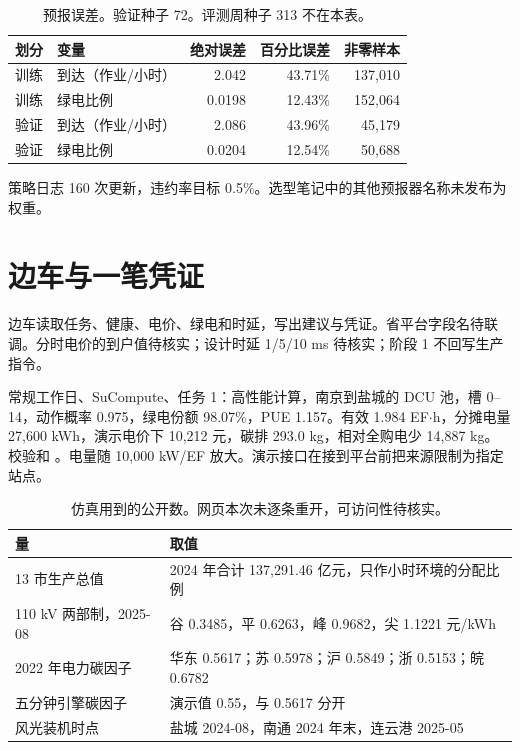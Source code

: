 \begin{table}[ht]
\centering
\caption{预报误差。验证种子 72。评测周种子 313 不在本表。}
\begin{tabular}{llrrr}
\toprule
划分 & 变量 & 绝对误差 & 百分比误差 & 非零样本 \\
\midrule
训练 & 到达（作业/小时） & 2.042 & 43.71\% & 137{,}010 \\
训练 & 绿电比例 & 0.0198 & 12.43\% & 152{,}064 \\
验证 & 到达（作业/小时） & 2.086 & 43.96\% & 45{,}179 \\
验证 & 绿电比例 & 0.0204 & 12.54\% & 50{,}688 \\
\bottomrule
\end{tabular}
\end{table}

策略日志 160 次更新，违约率目标 0.5\%。选型笔记中的其他预报器名称未发布为权重。

\section{边车与一笔凭证}
边车读取任务、健康、电价、绿电和时延，写出建议与凭证。省平台字段名待联调。分时电价的到户值待核实；设计时延 1/5/10 ms 待核实；阶段 1 不回写生产指令。

常规工作日、SuCompute、任务 1：高性能计算，南京到盐城的 DCU 池，槽 0--14，动作概率 0.975，绿电份额 98.07\%，PUE 1.157。有效 1.984 EF$\cdot$h，分摊电量 27{,}600 kWh，演示电价下 10{,}212 元，碳排 293.0 kg，相对全购电少 14{,}887 kg。校验和 。电量随 10{,}000 kW/EF 放大。演示接口在接到平台前把来源限制为指定站点。

\begin{table}[ht]
\centering
\caption{仿真用到的公开数。网页本次未逐条重开，可访问性待核实。}
\small
\begin{tabularx}{\textwidth}{lX}
\toprule
量 & 取值 \\
\midrule
13 市生产总值 & 2024 年合计 137{,}291.46 亿元，只作小时环境的分配比例 \\
110 kV 两部制，2025-08 & 谷 0.3485，平 0.6263，峰 0.9682，尖 1.1221 元/kWh \\
2022 年电力碳因子 & 华东 0.5617；苏 0.5978；沪 0.5849；浙 0.5153；皖 0.6782 \\
五分钟引擎碳因子 & 演示值 0.55，与 0.5617 分开 \\
风光装机时点 & 盐城 2024-08，南通 2024 年末，连云港 2025-05 \\
\bottomrule
\end{tabularx}
\end{table}


